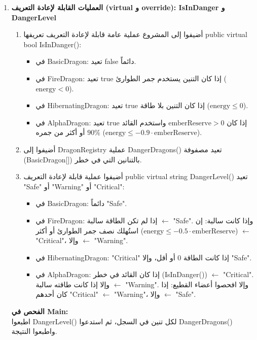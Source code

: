 \documentclass[14pt]{extarticle}
\begin{document}
\begin{enumerate}[label=\textbf{تمرين \arabic*:}, wide=0pt, leftmargin=*, itemsep=2.2em]
    \item \textbf{العمليات القابلة لإعادة التعريف (\textenglish{virtual} و \textenglish{override}): \textenglish{IsInDanger} و \textenglish{DangerLevel}}
    \begin{enumerate}[label=\textbf{(\arabic*)}]
        \item أضيفوا إلى المشروع عملية عامة قابلة لإعادة التعريف تعريفها \textenglish{public virtual bool IsInDanger()}:
        \begin{itemize}
            \item في \textenglish{BasicDragon}: تعيد \textenglish{false} دائماً.
            \item في \textenglish{FireDragon}: تعيد \textenglish{true} إذا كان التنين يستخدم جمر الطوارئ ($\text{energy} < 0$).
            \item في \textenglish{HibernatingDragon}: تعيد \textenglish{true} إذا كان التنين بلا طاقة ($\text{energy} \le 0$).
            \item في \textenglish{AlphaDragon}: تعيد \textenglish{true} إذا كان $\text{emberReserve} > 0$ واستخدم القائد $90\%$ أو أكثر من جمره ($\text{energy} \le -0.9 \cdot \text{emberReserve}$).
        \end{itemize}
        \item أضيفوا إلى \textenglish{DragonRegistry} عملية \textenglish{DangerDragons()} تعيد مصفوفة (\textenglish{BasicDragon[]}) بالتنانين التي في خطر.
        \item أضيفوا عملية قابلة لإعادة التعريف \textenglish{public virtual string DangerLevel()} تعيد \textenglish{"Safe"} أو \textenglish{"Warning"} أو \textenglish{"Critical"}:
        \begin{itemize}
            \item في \textenglish{BasicDragon}: دائماً \textenglish{"Safe"}.
            \item في \textenglish{FireDragon}: إذا لم تكن الطاقة سالبة $\leftarrow$ \textenglish{"Safe"}. وإذا كانت سالبة: إن استُهلك نصف جمر الطوارئ أو أكثر ($\text{energy} \le -0.5 \cdot \text{emberReserve}$) $\leftarrow$ \textenglish{"Critical"}، وإلا $\leftarrow$ \textenglish{"Warning"}.
            \item في \textenglish{HibernatingDragon}: \textenglish{"Critical"} إذا كانت الطاقة $0$ أو أقل، وإلا \textenglish{"Safe"}.
            \item في \textenglish{AlphaDragon}: إذا كان القائد في خطر (\textenglish{IsInDanger()}) $\leftarrow$ \textenglish{"Critical"}. وإلا إذا كانت طاقته سالبة $\leftarrow$ \textenglish{"Warning"}. وإلا افحصوا أعضاء القطيع: إذا كان أحدهم \textenglish{"Critical"} $\leftarrow$ \textenglish{"Warning"}، وإلا $\leftarrow$ \textenglish{"Safe"}.
        \end{itemize}
    \end{enumerate}
    \textbf{الفحص في \textenglish{Main}:} \\
    اطبعوا \textenglish{DangerLevel()} لكل تنين في السجل، ثم استدعوا \textenglish{DangerDragons()} واطبعوا النتيجة.


\end{enumerate}
\end{document}
